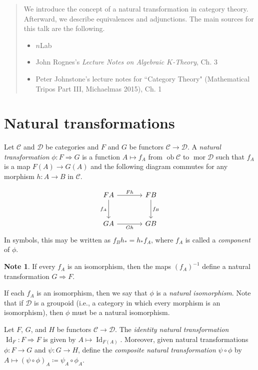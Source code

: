 \documentclass[10pt,letterpaper,cm]{nupset}
\theoremstyle{definition}
\newtheorem{note}[definition]{Note}
\theoremstyle{theorem}
\theoremstyle{remark}
\newcommand{\1}{\mathbf{1}}
\renewcommand{\c}{\mathscr{C}}
\renewcommand{\d}{\mathscr{D}}
\newcommand{\0}{\vec 0}
\DeclareMathOperator{\id}{Id}
\DeclareMathOperator{\ob}{ob}
\DeclareMathOperator{\mor}{mor}
\begin{document}
\begin{abstract}
We introduce the concept of a natural transformation in category theory. Afterward, we describe equivalences and adjunctions. The main sources for this talk are the following.
\begin{itemize}
\item $n$Lab
\item John Rognes's \textit{Lecture Notes on Algebraic $K$-Theory}, Ch. 3
\item Peter Johnstone's lecture notes for ``Category Theory" (Mathematical Tripos Part III, Michaelmas 2015), Ch. 1
\end{itemize}
\end{abstract}

\smallskip

\section{Natural transformations}


Let $\c$ and $\d$ be categories and $F$ and $G$ be functors $\c \to \d$.  A \textit{natural transformation} $\phi :F \Rightarrow G$  is a function $A \mapsto f_A$ from $\ob \c$ to $\mor \d$ such that $f_A$ is a map  $F(A) \to G(A)$ and the following diagram commutes for any morphism $h: A \to B$ in $\c$.

\[
\begin{tikzcd}[row sep=large, column sep = large]
FA \arrow[r, "F{h}"] \arrow[d, "f_A", swap]
& FB \arrow[d, "f_B"] \\
GA \arrow[r, "G{h}"']
& GB
\end{tikzcd}
\]
In symbols, this may be written as $f_Bh_{\ast} = h_{\ast}f_A$, where $f_A$ is called a \textit{component} of $\phi$.


\begin{note}\label{rmk}
If every $f_A$ is an isomorphism, then the maps $\left(f_A\right)^{{-1}}$ define a natural transformation $G \Rightarrow F$.
\end{note}

If each $f_A$ is an isomorphism, then we say that $\phi$ is a \textit{natural isomorphism}.
Note that if $\d$ is a groupoid (i.e., a category in which every morphism is an isomorphism), then $\phi$ must be a natural isomorphism.

\medskip

Let $F$, $G$, and $H$ be functors $\c \to \d$. The \textit{identity natural transformation} $\id_F : F \Rightarrow F$ is given by $A \mapsto \id_{F(A)}$. Moreover, given natural transformations $\phi: F \to G$ and $\psi: G \to H$, define the \textit{composite natural transformation} $\psi \circ \phi$ by $A \mapsto (\psi \circ \phi)_A \coloneqq \psi_{A} \circ \phi_{A}$.
\end{document}
